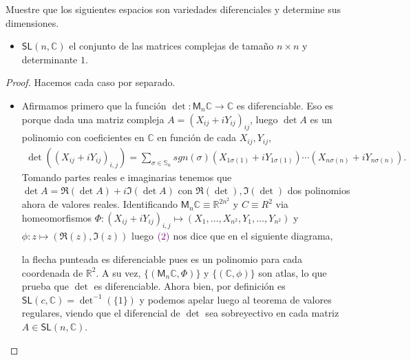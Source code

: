 \documentclass[11pt]{article}
\title{\paint{purple}{Geometr\'ia Diferencial}}
\author{\paint{purple}{Guido Arnone}}
\date{}
\newcommand{\R}{\mathbb{R}}
\newcommand{\C}{\mathbb{C}}
\newcommand{\paint}[2]{\color{#1}{#2}}
\newenvironment{exercise}[2][Ejercicio]{\begin{trivlist}
\item[\hskip \labelsep \paint{purple}{{\bfseries #1}}\hskip \labelsep {\bfseries #2.}]}{\end{trivlist}}
\begin{document}
\maketitle

\begin{exercise}{5} Muestre que los siguientes espacios son variedades diferenciales y determine sus
dimensiones. 
\begin{itemize}
\item[(i)] $\mathsf{SL}(n,\C)$ el conjunto de las matrices complejas de tama\~{n}o $n \times n$ y determinante $1$.
\end{itemize}
\end{exercise}
\begin{proof} Hacemos cada caso por separado.
\begin{itemize} 
\item[(i)] Afirmamos primero que la funci\'on $\det : \mathsf{M}_n\C \to \C$ es diferenciable. Eso es porque dada una matriz compleja $A = (X_{ij}+iY_{ij})_{ij}$, luego $\det A$ es un polinomio con coeficientes en $\C$ en funci\'on de cada $X_{ij}, Y_{ij}$,
\begin{align}
\det((X_{ij}+iY_{ij})_{i,j}) = \sum_{\sigma \in \mathbb{S}_n}sgn(\sigma)(X_{1\sigma(1)}+iY_{1\sigma(1)}) \cdots (X_{n \sigma(n)}+iY_{n\sigma(n)}).
\end{align}
Tomando partes reales e imaginarias tenemos que $\det A = \Re(\det A) + i \Im(\det A)$ con $\Re(\det), \Im(\det)$ dos polinomios ahora de valores reales. Identificando $\mathsf{M}_n\C \equiv \R^{2n^2}$ y $C \equiv R^2$ via homeomorfismos $\Phi : (X_{ij}+iY_{ij})_{i,j} \mapsto (X_1, \dots, X_{n^2}, Y_1, \dots, Y_{n^2})$ y $\phi : z \mapsto (\Re(z), \Im(z))$ luego $\paint{purple}{(2)}$ nos dice que en el siguiente diagrama,
\begin{center}
\end{center}
la flecha punteada es diferenciable pues es un polinomio para cada coordenada de $\R^2$. A su vez, $\{(\mathsf{M}_n\C,\Phi)\}$ y $\{(\C,\phi)\}$ son  atlas, lo que prueba que $\det$ es diferenciable. Ahora bien, por definici\'on es $\mathsf{SL}(c,\C) = \det^{-1}(\{1\})$ y podemos apelar luego al teorema de valores regulares, viendo que el diferencial de $\det$ sea sobreyectivo en cada matriz $A \in \mathsf{SL}(n,\C)$.
\end{itemize}
\end{proof}
\end{document}
